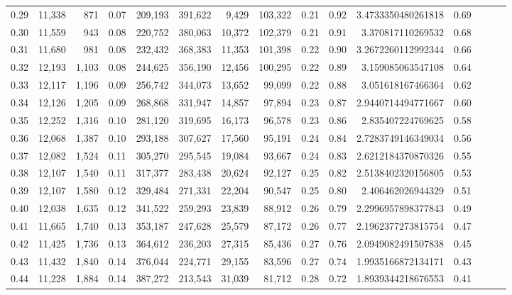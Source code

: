 \begin{tabular}{rrrrrrrrrrrrrrr}
0.29 &  11,338 &    871 &  0.07 &  209,193 &  391,622 &    9,429 &  103,322 &  0.21 &  0.92 &    3.4733350480261818 &      0.69 \\
0.30 &  11,559 &    943 &  0.08 &  220,752 &  380,063 &   10,372 &  102,379 &  0.21 &  0.91 &     3.370817110269532 &      0.68 \\
0.31 &  11,680 &    981 &  0.08 &  232,432 &  368,383 &   11,353 &  101,398 &  0.22 &  0.90 &    3.2672260112992344 &      0.66 \\
0.32 &  12,193 &  1,103 &  0.08 &  244,625 &  356,190 &   12,456 &  100,295 &  0.22 &  0.89 &     3.159085063547108 &      0.64 \\
0.33 &  12,117 &  1,196 &  0.09 &  256,742 &  344,073 &   13,652 &   99,099 &  0.22 &  0.88 &     3.051618167466364 &      0.62 \\
0.34 &  12,126 &  1,205 &  0.09 &  268,868 &  331,947 &   14,857 &   97,894 &  0.23 &  0.87 &    2.9440714494771667 &      0.60 \\
0.35 &  12,252 &  1,316 &  0.10 &  281,120 &  319,695 &   16,173 &   96,578 &  0.23 &  0.86 &     2.835407224769625 &      0.58 \\
0.36 &  12,068 &  1,387 &  0.10 &  293,188 &  307,627 &   17,560 &   95,191 &  0.24 &  0.84 &    2.7283749146349034 &      0.56 \\
0.37 &  12,082 &  1,524 &  0.11 &  305,270 &  295,545 &   19,084 &   93,667 &  0.24 &  0.83 &    2.6212184370870326 &      0.55 \\
0.38 &  12,107 &  1,540 &  0.11 &  317,377 &  283,438 &   20,624 &   92,127 &  0.25 &  0.82 &    2.5138402320156805 &      0.53 \\
0.39 &  12,107 &  1,580 &  0.12 &  329,484 &  271,331 &   22,204 &   90,547 &  0.25 &  0.80 &     2.406462026944329 &      0.51 \\
0.40 &  12,038 &  1,635 &  0.12 &  341,522 &  259,293 &   23,839 &   88,912 &  0.26 &  0.79 &    2.2996957898377843 &      0.49 \\
0.41 &  11,665 &  1,740 &  0.13 &  353,187 &  247,628 &   25,579 &   87,172 &  0.26 &  0.77 &    2.1962377273815754 &      0.47 \\
0.42 &  11,425 &  1,736 &  0.13 &  364,612 &  236,203 &   27,315 &   85,436 &  0.27 &  0.76 &    2.0949082491507838 &      0.45 \\
0.43 &  11,432 &  1,840 &  0.14 &  376,044 &  224,771 &   29,155 &   83,596 &  0.27 &  0.74 &    1.9935166872134171 &      0.43 \\
0.44 &  11,228 &  1,884 &  0.14 &  387,272 &  213,543 &   31,039 &   81,712 &  0.28 &  0.72 &    1.8939344218676553 &      0.41 \\

\end{tabular}
